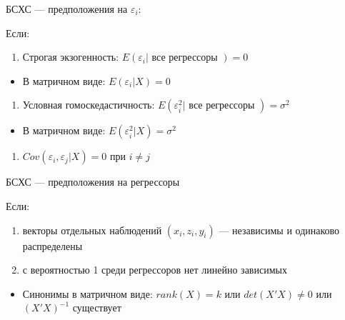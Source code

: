 \documentclass[ignorenonframetext,]{beamer}
\begin{document}
\begin{frame}{БСХС --- предположения на \(\varepsilon_i\):}

Если:

\begin{enumerate}
\def\labelenumi{\arabic{enumi}.}
\setcounter{enumi}{3}
\itemsep1pt\parskip0pt
\item
  Строгая экзогенность:
  \(E(\varepsilon_i | \text{ все регрессоры } )=0\)
\end{enumerate}

\begin{itemize}
\itemsep1pt\parskip0pt
\item
  В матричном виде: \(E(\varepsilon_i | X)=0\)
\end{itemize}

\begin{enumerate}
\def\labelenumi{\arabic{enumi}.}
\setcounter{enumi}{4}
\itemsep1pt\parskip0pt
\item
  Условная гомоскедастичность:
  \(E(\varepsilon_i^2 | \text{ все регрессоры })=\sigma^2\)
\end{enumerate}

\begin{itemize}
\itemsep1pt\parskip0pt
\item
  В матричном виде: \(E(\varepsilon_i^2 | X)=\sigma^2\)
\end{itemize}

\begin{enumerate}
\def\labelenumi{\arabic{enumi}.}
\setcounter{enumi}{5}
\itemsep1pt\parskip0pt
\item
  \(Cov(\varepsilon_i,\varepsilon_j | X)=0\) при \(i \neq j\)
\end{enumerate}

\end{frame}

\begin{frame}{БСХС --- предположения на регрессоры}

Если:

\begin{enumerate}
\def\labelenumi{\arabic{enumi}.}
\setcounter{enumi}{6}
\itemsep1pt\parskip0pt
\item
  векторы отдельных наблюдений \((x_i,z_i,y_i)\) --- независимы и
  одинаково распределены
\item
  с вероятностью 1 среди регрессоров нет линейно зависимых
\end{enumerate}

\begin{itemize}
\itemsep1pt\parskip0pt
\item
  Синонимы в матричном виде: \(rank(X)=k\) или \(det(X'X)\neq 0\) или
  \((X'X)^{-1}\) существует
\end{itemize}

\end{frame}
\end{document}
